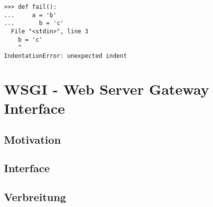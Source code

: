 \begin{lstlisting}[caption=Fehlerhafte Einrückung,label=lst:python-ident]
>>> def fail():
...     a = 'b'
...       b = 'c'
  File "<stdin>", line 3
    b = 'c'
    ^
IndentationError: unexpected indent
\end{lstlisting}




\section{WSGI - Web Server Gateway Interface}

\subsection{Motivation}


\subsection{Interface}


\subsection{Verbreitung}

